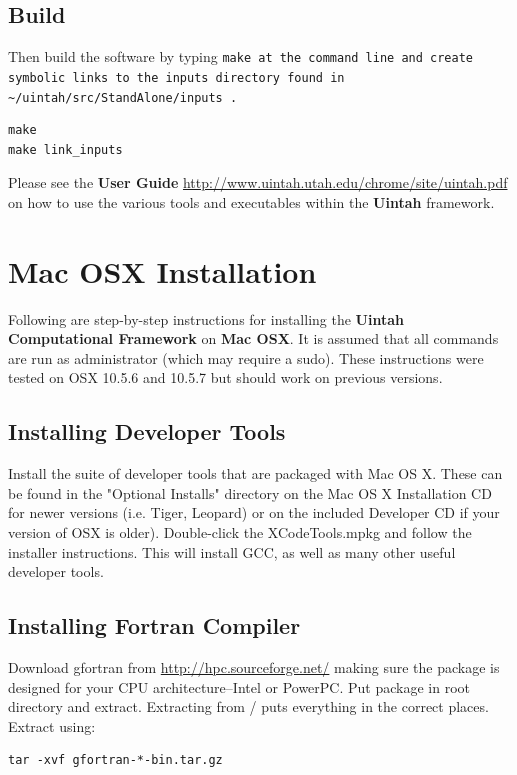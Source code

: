 \documentclass[12pt]{article}
\newcommand{\TT}[1]{\tt{#1} \normalfont}
\begin{document}
\subsection{Build}

Then build the software by typing \TT{make} at the command line and create symbolic links to the inputs directory found in \TT{\textasciitilde/uintah/src/StandAlone/inputs}.
\begin{verbatim}
make
make link_inputs
\end{verbatim}

Please see the \textbf{User Guide}
\url{http://www.uintah.utah.edu/chrome/site/uintah.pdf} on how to use
the various tools and executables within the \textbf{Uintah}
framework.

\section{Mac OSX Installation}

Following are step-by-step instructions for installing the \textbf{Uintah Computational Framework} on \textbf{Mac OSX}.  It is assumed that all commands are run as administrator (which may require a sudo).  These instructions were tested on OSX 10.5.6 and 10.5.7 but should work on previous versions.

\subsection{Installing Developer Tools}
Install the suite of developer tools that are packaged with Mac OS X.  These can be found in the "Optional Installs" directory on the Mac OS X Installation CD for newer versions (i.e. Tiger, Leopard) or on the included Developer CD if your version of OSX is older).  Double-click the XCodeTools.mpkg and follow the installer instructions.  This will install GCC, as well as many other useful developer tools.

\subsection{Installing Fortran Compiler}
Download gfortran from \url{http://hpc.sourceforge.net/} making sure the package is designed for your CPU architecture--Intel or PowerPC.  Put package in root directory and extract.  Extracting from / puts everything in the correct places.  Extract using:

\begin{verbatim}
tar -xvf gfortran-*-bin.tar.gz
\end{verbatim}
\end{document}
